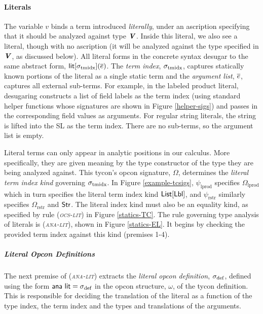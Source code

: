 \documentclass[9pt,preprint]{sigplanconf}
\newcommand{\rulename}[1]{({\textsc{\textsl{#1}}})}
\begin{document}
\paragraph{Literals} The variable $v$ binds a term introduced \emph{literally}, under an ascription specifying that it should be analyzed against type ${\textbf{\textit{V}}}$. Inside this literal, we also see a literal, though with no ascription (it will be analyzed against the type specified in ${\textbf{\textit{V}}}$, as discussed below). All literal forms in the concrete syntax desugar to the same abstract form, ${\sf lit}[\sigma_\text{tmidx}](\overline{e})$. The \emph{term index},  $\sigma_\text{tmidx}$, captures statically known portions of the literal as a single static term and the \emph{argument list}, $\overline{e}$,  captures all external sub-terms. For example, in the labeled product literal, desugaring constructs a list of field labels as the term index (using standard helper functions whose signatures are shown in Figure \ref{helper-sigs}) and passes in the  corresponding field values as arguments. For regular string literals, the string is lifted into the SL as the term index. There are no sub-terms, so the argument list is empty.

Literal terms can only appear in analytic positions in our calculus. More specifically, they are given meaning by {the type constructor of the type they are being analyzed against}. 
This tycon's opcon signature, $\Omega$,  determines the \emph{literal term index kind} governing $\sigma_\text{tmidx}$. In Figure \ref{example-tcsigs}, $\psi_\text{lprod}$ specifies $\Omega_\text{lprod}$ which in turn specifies the literal term index kind ${\sf List}[{\sf Lbl}]$, and $\psi_\text{rstr}$ similarly specifies $\Omega_\text{rstr}$ and ${{\sf Str}}$. The literal index kind must also be an equality kind, as specified by rule \rulename{ocs-lit} in Figure \ref{statics-TC}. The rule governing type analysis of literals is \rulename{ana-lit}, shown in Figure \ref{statics-EL}. It begins by checking the provided term index against this kind (premises 1-4).%

\subparagraph{Literal Opcon Definitions} 


The next premise of \rulename{ana-lit} extracts the \emph{literal opcon definition}, $\sigma_\text{def}$, defined using the form ${\sf ana~lit}=\sigma_\text{def}$ in the opcon structure, $\omega$, of the tycon definition. This  is responsible for deciding the translation of the literal as a function of the type index, the term index and  the types and translations of the arguments. %
\end{document}
